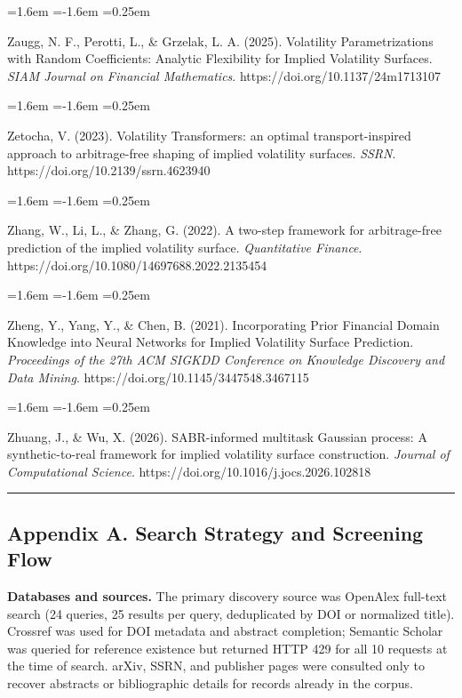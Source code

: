 \documentclass[11pt]{article}
\begin{document}
\begin{list}{}{\leftmargin=1.6em \itemindent=-1.6em \itemsep=0.25em}
\item Zaugg, N. F., Perotti, L., \& Grzelak, L. A. (2025). Volatility Parametrizations with Random Coefficients: Analytic Flexibility for Implied Volatility Surfaces. \textit{SIAM Journal on Financial Mathematics}. https://doi.org/10.1137/24m1713107
\end{list}
\begin{list}{}{\leftmargin=1.6em \itemindent=-1.6em \itemsep=0.25em}
\item Zetocha, V. (2023). Volatility Transformers: an optimal transport-inspired approach to arbitrage-free shaping of implied volatility surfaces. \textit{SSRN}. https://doi.org/10.2139/ssrn.4623940
\end{list}
\begin{list}{}{\leftmargin=1.6em \itemindent=-1.6em \itemsep=0.25em}
\item Zhang, W., Li, L., \& Zhang, G. (2022). A two-step framework for arbitrage-free prediction of the implied volatility surface. \textit{Quantitative Finance}. https://doi.org/10.1080/14697688.2022.2135454
\end{list}
\begin{list}{}{\leftmargin=1.6em \itemindent=-1.6em \itemsep=0.25em}
\item Zheng, Y., Yang, Y., \& Chen, B. (2021). Incorporating Prior Financial Domain Knowledge into Neural Networks for Implied Volatility Surface Prediction. \textit{Proceedings of the 27th ACM SIGKDD Conference on Knowledge Discovery and Data Mining}. https://doi.org/10.1145/3447548.3467115
\end{list}
\begin{list}{}{\leftmargin=1.6em \itemindent=-1.6em \itemsep=0.25em}
\item Zhuang, J., \& Wu, X. (2026). SABR-informed multitask Gaussian process: A synthetic-to-real framework for implied volatility surface construction. \textit{Journal of Computational Science}. https://doi.org/10.1016/j.jocs.2026.102818
\end{list}
\par\medskip\hrule\medskip
\subsection*{Appendix A. Search Strategy and Screening Flow}
\textbf{Databases and sources.} The primary discovery source was OpenAlex full-text search (24 queries, 25 results per query, deduplicated by DOI or normalized title). Crossref was used for DOI metadata and abstract completion; Semantic Scholar was queried for reference existence but returned HTTP 429 for all 10 requests at the time of search. arXiv, SSRN, and publisher pages were consulted only to recover abstracts or bibliographic details for records already in the corpus.
\end{document}
